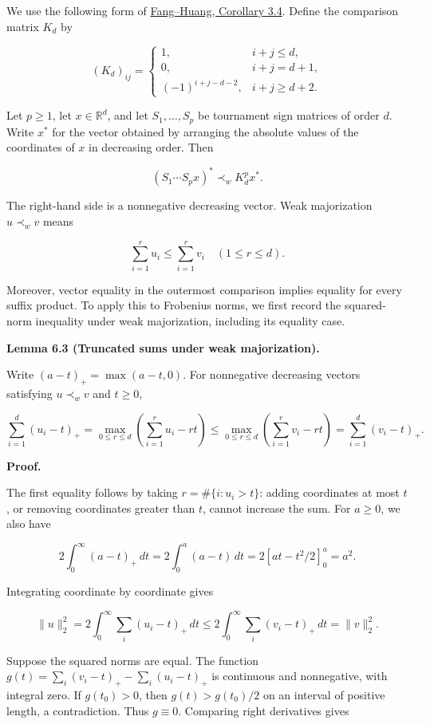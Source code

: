 \documentclass[11pt,a4paper]{article}
\begin{document}
We use the following form of \href{https://arxiv.org/html/2608.06238v1\#S3}{Fang--Huang, Corollary 3.4}. Define the comparison matrix \(K_d\) by

\[
(K_d)_{ij}=\begin{cases}
1,&i+j\le d,\\
0,&i+j=d+1,\\
(-1)^{i+j-d-2},&i+j\ge d+2.
\end{cases}
\]

Let \(p\ge1\), let \(x\in\mathbb R^d\), and let \(S_1,\ldots,S_p\) be tournament sign matrices of order \(d\). Write \(x^*\) for the vector obtained by arranging the absolute values of the coordinates of \(x\) in decreasing order. Then

\[
(S_1\cdots S_p x)^*\prec_w K_d^p x^*.
\]

The right-hand side is a nonnegative decreasing vector. Weak majorization \(u\prec_w v\) means

\[
\sum_{i=1}^r u_i\le\sum_{i=1}^r v_i
\quad(1\le r\le d).
\]

Moreover, vector equality in the outermost comparison implies equality for every suffix product. To apply this to Frobenius norms, we first record the squared-norm inequality under weak majorization, including its equality case.

\textbf{Lemma 6.3 (Truncated sums under weak majorization).}

Write \((a-t)_+=\max(a-t,0)\). For nonnegative decreasing vectors satisfying \(u\prec_w v\) and \(t\ge0\),

\[
\sum_{i=1}^d(u_i-t)_+
=\max_{0\le r\le d}\left(\sum_{i=1}^r u_i-rt\right)
\le\max_{0\le r\le d}\left(\sum_{i=1}^r v_i-rt\right)
=\sum_{i=1}^d(v_i-t)_+.
\]

\textbf{Proof.}

The first equality follows by taking \(r=\#\{i:u_i>t\}\): adding coordinates at most \(t\), or removing coordinates greater than \(t\), cannot increase the sum. For \(a\ge0\), we also have

\[
2\int_0^\infty(a-t)_+\,dt
=2\int_0^a(a-t)\,dt
=2[at-t^2/2]_0^a=a^2.
\]

Integrating coordinate by coordinate gives

\[
\|u\|_2^2
=2\int_0^\infty\sum_i(u_i-t)_+\,dt
\le2\int_0^\infty\sum_i(v_i-t)_+\,dt
=\|v\|_2^2.
\]

Suppose the squared norms are equal. The function \(g(t)=\sum_i(v_i-t)_+-\sum_i(u_i-t)_+\) is continuous and nonnegative, with integral zero. If \(g(t_0)>0\), then \(g(t)>g(t_0)/2\) on an interval of positive length, a contradiction. Thus \(g\equiv0\). Comparing right derivatives gives
\end{document}
